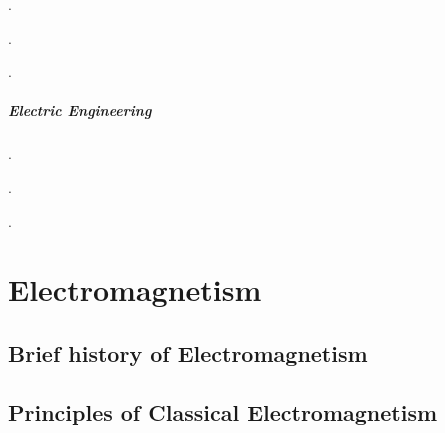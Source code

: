 \documentclass[letterpaper,10pt,english]{jupyterBook}
\begin{document}
\sphinxAtStartPar
{\hyperref[\detokenize{ch/energy:classical-electromagnetism-energy}]{}}.

\sphinxAtStartPar
{\hyperref[\detokenize{ch/regimes:classical-electromagnetism-regimes}]{}}.

\sphinxAtStartPar
{}.
\subsubsection*{Electric Engineering}

\sphinxAtStartPar
{}.

\sphinxAtStartPar
{}.

\sphinxAtStartPar
{}.

\sphinxstepscope


\part{Electromagnetism}

\sphinxstepscope




\chapter{Brief history of Electromagnetism}
\label{\detokenize{ch/experiments:brief-history-of-electromagnetism}}\label{\detokenize{ch/experiments:classical-electromagnetism-first-experiments}}\label{\detokenize{ch/experiments::doc}}
\sphinxstepscope


\chapter{Principles of Classical Electromagnetism}
\label{\detokenize{ch/principles:principles-of-classical-electromagnetism}}\label{\detokenize{ch/principles:classical-electromagnetism-principles}}\label{\detokenize{ch/principles::doc}}
\sphinxstepscope
\end{document}
